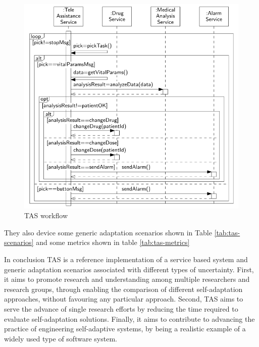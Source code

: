 \begin{figure}[h]
	\centerline
	{\includegraphics[scale=0.55]{img/tas-workflow.png}}
	\caption[TAS workflow]{TAS workflow}
	\label{fig:tas-workflow}
\end{figure}

They also device some generic adaptation scenarios shown in Table \ref{tab:tas-scenarios} and some metrics shown in table \ref{tab:tas-metrics}

In conclusion TAS is a reference implementation of a service based system and generic adaptation scenarios associated with different types of uncertainty. First, it aims to promote research and understanding among multiple researchers and research groups, through enabling the comparison of different self-adaptation approaches, without favouring any particular approach. Second, TAS aims to serve the advance of single research efforts by reducing the time required to evaluate self-adaptation solutions. Finally, it aims to contribute to advancing the practice of engineering self-adaptive systems, by being a realistic example of a widely used type of software system.

